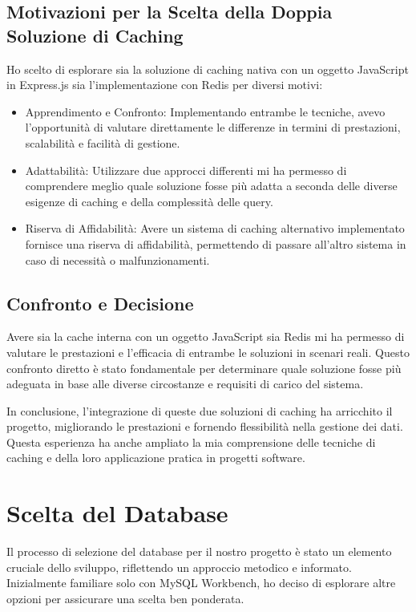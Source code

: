 \documentclass[12pt]{article}
\begin{document}
\subsection{Motivazioni per la Scelta della Doppia Soluzione di Caching}


Ho scelto di esplorare sia la soluzione di caching nativa con un oggetto JavaScript in Express.js sia l'implementazione con Redis per diversi motivi:
\begin{itemize}
\item Apprendimento e Confronto: Implementando entrambe le tecniche, avevo l'opportunità di valutare direttamente le differenze in termini di prestazioni, scalabilità e facilità di gestione.
\item Adattabilità: Utilizzare due approcci differenti mi ha permesso di comprendere meglio quale soluzione fosse più adatta a seconda delle diverse esigenze di caching e della complessità delle query.
\item Riserva di Affidabilità: Avere un sistema di caching alternativo implementato fornisce una riserva di affidabilità, permettendo di passare all'altro sistema in caso di necessità o malfunzionamenti.
\end{itemize}

\subsection{Confronto e Decisione}

Avere sia la cache interna con un oggetto JavaScript sia Redis mi ha permesso di valutare le prestazioni e l'efficacia di entrambe le soluzioni in scenari reali. Questo confronto diretto è stato fondamentale per determinare quale soluzione fosse più adeguata in base alle diverse circostanze e requisiti di carico del sistema.

In conclusione, l'integrazione di queste due soluzioni di caching ha arricchito il progetto, migliorando le prestazioni e fornendo flessibilità nella gestione dei dati. Questa esperienza ha anche ampliato la mia comprensione delle tecniche di caching e della loro applicazione pratica in progetti software.

\section{Scelta del Database}
Il processo di selezione del database per il nostro progetto è stato un elemento cruciale dello sviluppo, riflettendo un approccio metodico e informato. Inizialmente familiare solo con MySQL Workbench, ho deciso di esplorare altre opzioni per assicurare una scelta ben ponderata.
\end{document}
